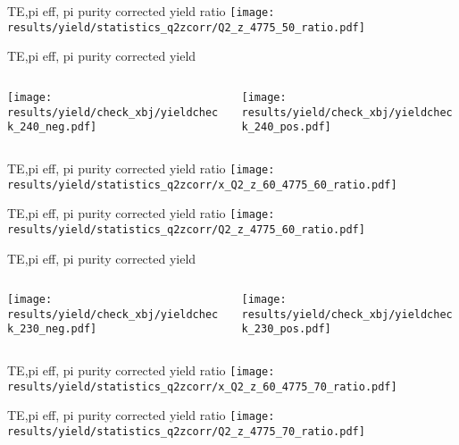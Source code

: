 \begin{frame}{TE,pi eff, pi purity corrected yield ratio}
\texttt{[image: results/yield/statistics\_q2zcorr/Q2\_z\_4775\_50\_ratio.pdf]}
\end{frame}
\begin{frame}{TE,pi eff, pi purity corrected yield}
\begin{columns}
\begin{column}[T]{0.5\textwidth}
\texttt{[image: results/yield/check\_xbj/yieldcheck\_240\_neg.pdf]}
\end{column}
\begin{column}[T]{0.5\textwidth}
\texttt{[image: results/yield/check\_xbj/yieldcheck\_240\_pos.pdf]}
\end{column}
\end{columns}
\end{frame}
\begin{frame}{TE,pi eff, pi purity corrected yield ratio}
\texttt{[image: results/yield/statistics\_q2zcorr/x\_Q2\_z\_60\_4775\_60\_ratio.pdf]}
\end{frame}
\begin{frame}{TE,pi eff, pi purity corrected yield ratio}
\texttt{[image: results/yield/statistics\_q2zcorr/Q2\_z\_4775\_60\_ratio.pdf]}
\end{frame}
\begin{frame}{TE,pi eff, pi purity corrected yield}
\begin{columns}
\begin{column}[T]{0.5\textwidth}
\texttt{[image: results/yield/check\_xbj/yieldcheck\_230\_neg.pdf]}
\end{column}
\begin{column}[T]{0.5\textwidth}
\texttt{[image: results/yield/check\_xbj/yieldcheck\_230\_pos.pdf]}
\end{column}
\end{columns}
\end{frame}
\begin{frame}{TE,pi eff, pi purity corrected yield ratio}
\texttt{[image: results/yield/statistics\_q2zcorr/x\_Q2\_z\_60\_4775\_70\_ratio.pdf]}
\end{frame}
\begin{frame}{TE,pi eff, pi purity corrected yield ratio}
\texttt{[image: results/yield/statistics\_q2zcorr/Q2\_z\_4775\_70\_ratio.pdf]}
\end{frame}
